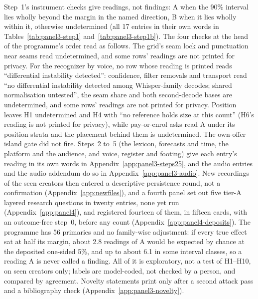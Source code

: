Step~1's instrument checks give readings, not findings: A when the 90\% interval lies wholly beyond the margin in the
named direction, B when it lies wholly within it, otherwise undetermined (all 17 entries in their own words in
Tables~\ref{tab:panel3-step1} and~\ref{tab:panel3-step1b}). The four checks at the head of the programme's order read
as follows. The grid's seam lock and punctuation near seams read undetermined, and some rows' readings are not
printed for privacy. For the recognizer by voice, no row whose reading is printed reads ``differential instability
detected'': confidence, filter removals and transport read ``no differential instability detected among
Whisper-family decodes; shared normalisation untested'', the seam share and both second-decode bases are
undetermined, and some rows' readings are not printed for privacy. Position leaves H1
undetermined and H4 with ``no reference holds size at this count'' (H6's reading is not printed for privacy), while
pay-or-enrol asks read A under its position strata and the placement behind them is undetermined. The own-offer island
gate did not fire. Steps~2 to~5 (the lexicon, forecasts and time, the platform and the audience, and voice, register
and footing) give each entry's reading in its own words in Appendix~\ref{app:panel3-steps25}, and the audio entries and
the audio addendum do so in Appendix~\ref{app:panel3-audio}. New recordings of the seen creators then
entered a descriptive persistence round, not a confirmation (Appendix~\ref{app:newfiles}), and a fourth panel
set out five tier-A layered research questions in twenty entries, none yet run (Appendix~\ref{app:panel4}), and
registered fourteen of them, in fifteen cards, with an outcome-free step~0, before any count (Appendix~\ref{app:panel4-deposits}). The programme has 56 primaries and no family-wise adjustment: if every true effect
sat at half its margin, about 2.8 readings of A would be expected by chance at the deposited one-sided 5\%, and up to
about 6.1 in some interval classes, so a reading A is never called a finding. All of it is exploratory, not a test of
H1--H10, on seen creators only; labels are model-coded, not checked by a person, and compared by agreement. Novelty
statements print only after a second attack pass and a bibliography check (Appendix~\ref{app:panel3-novelty}).

